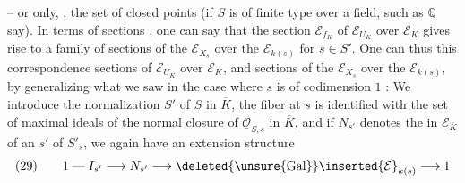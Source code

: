 -- or only, , the set of closed points (if $S$ is of finite type over a field, such as $\mathbb Q$ say). In terms of sections , one can say that the section $\mathcal E_{f_K}$ of $\mathcal E_{U_K}$ over $\mathcal E_K$ gives rise to a family of sections of the $\mathcal E_{X_s}$ over the $\mathcal E_{k(s)}$ for $s\in S'$. One can thus   this correspondence  sections of $\mathcal E_{U_K}$ over $\mathcal E_K$, and sections of the $\mathcal E_{X_s}$ over the $\mathcal E_{k(s)}$, by generalizing what we saw in the case where $s$ is of codimension $1$ : We introduce the normalization $S'$ of $S$ in $\overline K$, the fiber at $s$ is identified with the set of maximal ideals of the normal closure of $\underline{\mathcal O}_{S,s}$ in $\overline K$, and if $N_{s'}$ denotes the   in $\mathcal E_{\overline K}$ of an $s'$ of $S'_s$, we again have an extension structure
\[
(29)\qquad
1\mathrel{\text{---}}I_{s'}\longrightarrow N_{s'}\longrightarrow {\deleted{\unsure{\operatorname{Gal}}}\inserted{\mathcal E}}_{k(s)}\longrightarrow 1
\]

